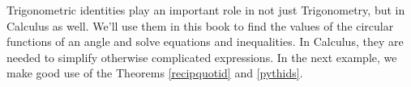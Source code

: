 
\smallskip

Trigonometric identities play an important role in not just Trigonometry, but in Calculus as well.  We'll use them in this book to find the values of the circular functions of an angle and solve equations and inequalities.  In Calculus, they are needed to simplify otherwise complicated expressions.  In the next example, we make good use of the Theorems \ref{recipquotid} and \ref{pythids}.

